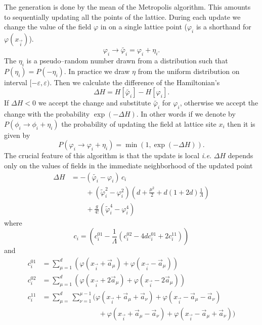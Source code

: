 \documentclass[a4paper]{llncs}
\renewcommand{\a}[1]{\v{a}_{#1}}
\renewcommand{\v}[1]{\vec{#1}}
\newcommand{\vphi}{\varphi}
\newcommand{\vi}{{\vec{i}}}
\begin{document}
The  generation is done by the mean of the Metropolis
algorithm\cite{metropolis,binney}. This amounts to sequentially updating all the points of the
lattice. During each update we change the value of the field $\vphi$
in on a single lattice point ($\vphi_i$ is a shorthand for $\vphi(x_\vi)$).
\begin{equation}
\vphi_i\longrightarrow\widetilde{\vphi_i}=\vphi_i+\eta_i.
\end{equation}
The $\eta_i$ is a pseudo--random number drawn from a distribution such
that $P(\eta_i) = P(-\eta_i)$. In practice we draw  $\eta$ from the
uniform distribution on interval $[-\varepsilon,\varepsilon)$.  Then we
calculate the difference of the Hamiltonian's
\begin{equation}
\Delta H=H[\widetilde{\vphi_i}]-H[\vphi_i].
\end{equation}
If $\Delta H < 0$ we accept the change and substitute
$\widetilde{\vphi_i}$ for $\vphi_i$, otherwise we accept the change
with the probability $\exp(-\Delta H)$. In other words if we denote by
$P(\phi_i\rightarrow\phi_i+\eta_i)$ the probability of updating the
field at lattice site $x_i$ then it is given by
\begin{equation}
P(\vphi_i\rightarrow\vphi_i+\eta_i)=\min\left(1,\exp(-\Delta H)\right).
\end{equation}
The crucial feature of this algorithm is that the update is local {\em
  i.e.} $\Delta H$ depends only on the values of fields in the
immediate neighborhood of the updated point 
\begin{equation}
\begin{split}
\Delta H & = -(\widetilde{\vphi_i}-\vphi_i)\, c_i\\
&\phantom{= -}
+(\widetilde{\vphi}^2_i-\vphi_i^2)\left(d+\frac{\mu^2}{2}+d (1+2d)\frac{1}{\Lambda}\right)\\
&\phantom{= -}+\frac{g}{4!}\left(\widetilde{\vphi}^4_i-\vphi^4_i\right)
\end{split}
\end{equation}
where
\begin{equation}
c_i=\left(c^{01}_i-\frac{1}{\Lambda}(c^{02}_i-4 d c^{01}_i+2 c^{11}_i )\right)
\end{equation}
and
\begin{equation}\label{eq:corona-terms}\begin{split} 
c_i^{01}&=\sum_{\mu=1}^d\left(\vphi(x_\vi+\a\mu)+\vphi(x_\vi-\a\mu)\right)\\
c_i^{02}&=\sum_{\mu=1}^d\left(\vphi(x_\vi+2\a\mu)+\vphi(x_\vi-2\a\mu)\right)\\
c_i^{11}&=\sum_{\mu=}^d\sum_{\nu=1}^{\mu-1}
\bigl(\vphi(x_\vi+\a\mu+\a\nu)+\vphi(x_\vi-\a\mu-\a\nu)\\
&\phantom{+=\sum_{\mu=}^d\sum_{\nu=1}^{\mu-1}
}
+ \vphi(x_\vi+\a\mu-\a\nu)+\vphi(x_\vi-\a\mu+\a\nu)
\bigr)
\end{split}
\end{equation}
\end{document}
